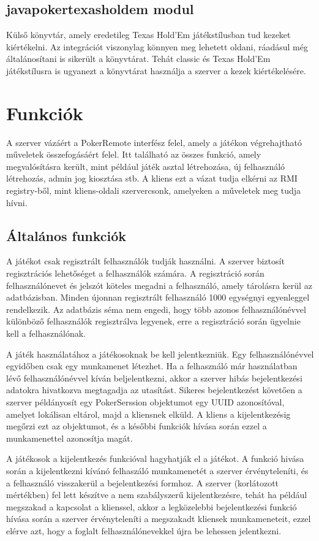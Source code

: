 \subsection{javapokertexasholdem modul}
Külső könyvtár, amely eredetileg Texas Hold'Em játékstílusban tud kezeket kiértékelni. Az integrációt viszonylag könnyen meg lehetett oldani, ráadásul még általánosítani is sikerült a könyvtárat. Tehát classic és Texas Hold'Em játékstílusra is ugyanezt a könyvtárat használja a szerver a kezek kiértékelésére.

\section{Funkciók}
A szerver vázáért a PokerRemote interfész felel, amely a játékon végrehajtható műveletek összefogásáért felel. Itt található az összes funkció, amely megvalósításra került, mint például játék asztal létrehozása, új felhasználó létrehozás, admin jog kiosztása stb. A kliens ezt a vázat tudja elkérni az RMI registry-ből, mint kliens-oldali szervercsonk, amelyeken a műveletek meg tudja hívni.
\subsection{Általános funkciók}

A játékot csak regisztrált felhasználók tudják használni. A szerver biztosít regisztrációs lehetőséget a felhasználók számára. A regisztráció során felhasználónevet és jelszót köteles megadni a felhasználó, amely tárolásra kerül az adatbázisban. Minden újonnan regisztrált felhasználó 1000 egységnyi egyenleggel rendelkezik. Az adatbázis séma nem engedi, hogy több azonos felhasználónévvel különböző felhasználók regisztrálva legyenek, erre a regisztráció során ügyelnie kell a felhasználónak.

A játék használatához a játékosoknak be kell jelentkezniük. Egy felhasználónévvel egyidőben csak egy munkamenet létezhet. Ha a felhasználó már használatban lévő felhasználónévvel kíván beljelentkezni, akkor a szerver hibás bejelentkezési adatokra hivatkozva megtagadja az utasítást. Sikeres bejelentkezést követően a szerver példányosít egy PokerSerssion objektumot egy UUID \cite{uuid} azonosítóval, amelyet lokálisan eltárol, majd a kliensnek elküld. A kliens a kijelentkezésig megőrzi ezt az objektumot, és a későbbi funkciók hívása során ezzel a munkamenettel azonosítja magát.

A játékosok a kijelentkezés funkcióval hagyhatják el a játékot. A funkció hivása során a kijelentkezni kívánó felhaszáló munkamenetét a szerver érvényteleníti, és a felhasználó visszakerül a bejelentkezési formhoz. A szerver (korlátozott mértékben) fel lett készítve a nem szabályszerű kijelentkezésre, tehát ha például megszakad a kapcsolat a klienssel, akkor a legközelebbi bejelentkezési funkció hívása során a szerver érvényteleníti a megszakadt kliensek munkameneteit, ezzel elérve azt, hogy a foglalt felhasználónevekkel újra be lehessen jelentkezni.

